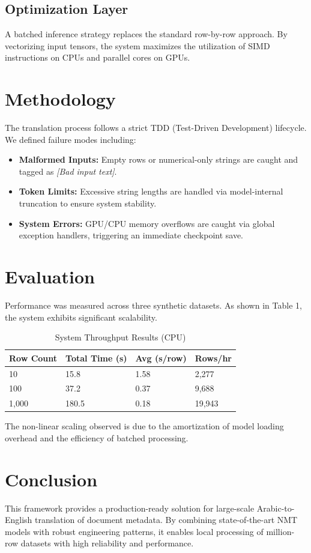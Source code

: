 \documentclass[10pt,twocolumn]{article}
\begin{document}
\subsection{Optimization Layer}
A batched inference strategy replaces the standard row-by-row approach. By vectorizing input tensors, the system maximizes the utilization of SIMD instructions on CPUs and parallel cores on GPUs.

\section{Methodology}
The translation process follows a strict TDD (Test-Driven Development) lifecycle. We defined failure modes including:
\begin{itemize}
    \item \textbf{Malformed Inputs:} Empty rows or numerical-only strings are caught and tagged as \textit{[Bad input text]}.
    \item \textbf{Token Limits:} Excessive string lengths are handled via model-internal truncation to ensure system stability.
    \item \textbf{System Errors:} GPU/CPU memory overflows are caught via global exception handlers, triggering an immediate checkpoint save.
\end{itemize}

\section{Evaluation}
Performance was measured across three synthetic datasets. As shown in Table 1, the system exhibits significant scalability.

\begin{table}[h]
\centering
\caption{System Throughput Results (CPU)}
\label{tab:bench}
\begin{tabular}{@{}llll@{}}
\toprule
Row Count & Total Time (s) & Avg (s/row) & Rows/hr \\ \midrule
10        & 15.8           & 1.58        & 2,277   \\
100       & 37.2           & 0.37        & 9,688   \\
1,000     & 180.5          & 0.18        & 19,943  \\ \bottomrule
\end{tabular}
\end{table}

The non-linear scaling observed is due to the amortization of model loading overhead and the efficiency of batched processing.

\section{Conclusion}
This framework provides a production-ready solution for large-scale Arabic-to-English translation of document metadata. By combining state-of-the-art NMT models with robust engineering patterns, it enables local processing of million-row datasets with high reliability and performance.
\end{document}
